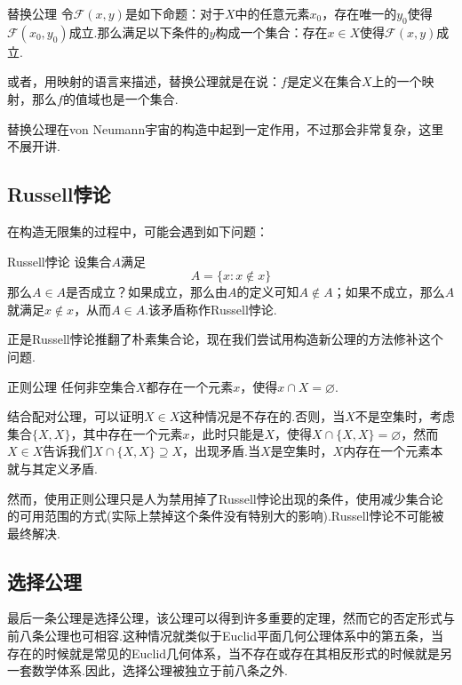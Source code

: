\documentclass[lang=cn, zihao=5]{elegantbook}
\begin{document}
\begin{axiom}{替换公理}
	令$\mathcal{F}(x,y)$是如下命题：对于$X$中的任意元素$x_0$，存在唯一的$y_0$使得$\mathcal{F}(x_0,y_0)$成立.那么满足以下条件的$y$构成一个集合：存在$x \in X$使得$\mathcal{F}(x,y)$成立.
\end{axiom}

或者，用映射的语言来描述，替换公理就是在说：$f$是定义在集合$X$上的一个映射，那么$f$的值域也是一个集合.

替换公理在von Neumann宇宙的构造中起到一定作用，不过那会非常复杂，这里不展开讲.

\subsection{Russell悖论}

在构造无限集的过程中，可能会遇到如下问题：

\begin{definition}{Russell悖论}
	设集合$A$满足$$A = \{ x:x \notin x \}$$
	那么$A \in A$是否成立？如果成立，那么由$A$的定义可知$A \notin A$；如果不成立，那么$A$就满足$x \notin x$，从而$A \in A$.该矛盾称作Russell悖论.
\end{definition}

正是Russell悖论推翻了朴素集合论，现在我们尝试用构造新公理的方法修补这个问题.

\begin{axiom}{正则公理}
	任何非空集合$X$都存在一个元素$x$，使得$x \cap X = \varnothing$.
\end{axiom}

结合配对公理，可以证明$X \in X$这种情况是不存在的.否则，当$X$不是空集时，考虑集合$\{ X,X \}$，其中存在一个元素$x$，此时只能是$X$，使得$X \cap \{ X,X \}=\varnothing$，然而$X \in X$告诉我们$X \cap \{ X,X \} \supseteq X$，出现矛盾.当$X$是空集时，$X$内存在一个元素本就与其定义矛盾.

然而，使用正则公理只是人为禁用掉了Russell悖论出现的条件，使用减少集合论的可用范围的方式(实际上禁掉这个条件没有特别大的影响).Russell悖论不可能被最终解决.

\subsection{选择公理}

最后一条公理是选择公理，该公理可以得到许多重要的定理，然而它的否定形式与前八条公理也可相容.这种情况就类似于Euclid平面几何公理体系中的第五条，当存在的时候就是常见的Euclid几何体系，当不存在或存在其相反形式的时候就是另一套数学体系.因此，选择公理被独立于前八条之外.
\end{document}
